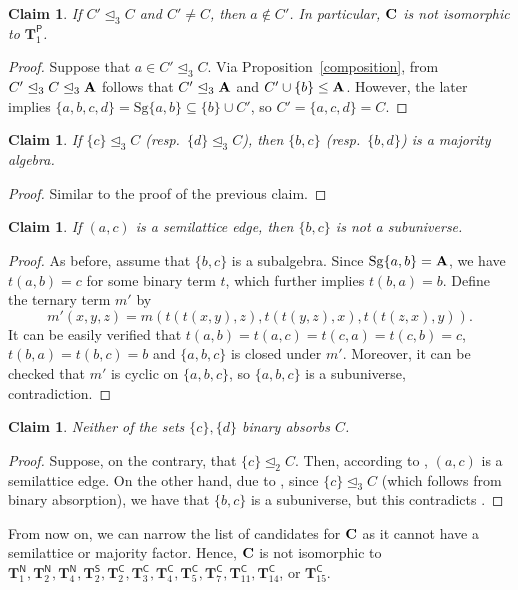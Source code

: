 \documentclass[11pt]{amsart}
\newcommand{\m}[1]{\mathbf{\uppercase{#1}}}
\newcommand{\n}{\scriptscriptstyle{\mathsf{N}}}
\newcommand{\co}{\scriptscriptstyle{\mathsf{C}}}
\theoremstyle{definition}
\theoremstyle{remark}
\theoremstyle{plain}
\newtheorem{claim}[thm]{Claim}
\def\T{\mathbf{T}}
\begin{document}
\begin{claim}\label{claimanijeu3aps}
  If $ C'\trianglelefteq_3 C$ and $C'\neq C$, then $a\notin C'$. In particular, $\m c$ is not isomorphic to $\T^{\scriptscriptstyle{\mathsf{P}}}_1$.
\end{claim}
\begin{proof}
Suppose that $a\in C'\trianglelefteq_3 C$. Via Proposition~\ref{composition}, from $C'\trianglelefteq_3C\trianglelefteq_3\m a$ follows that $C'\trianglelefteq_3\m a$ and $C'\cup\{b\}\leq \m a$. However, the later implies $\{a,b,c,d\}=\mathrm{Sg}\{a,b\}\subseteq \{b\}\cup C'$, so $C'=\{a,c,d\}=C$.   
\end{proof}
\begin{claim}\label{claimde3apbs}
If $\{c\}\trianglelefteq_3C$ (resp.~$\{d\}\trianglelefteq_3C$), then $\{b,c\}$ (resp.~$\{b,d\}$) is a majority algebra.
\end{claim}
\begin{proof}
    Similar to the proof of the previous claim.
\end{proof}
\begin{claim}\label{claimnijepodalg}
If $(a,c)$ is a semilattice edge, then $\{b,c\}$ is not a subuniverse. 
\end{claim}
\begin{proof}
As before, assume that $\{b,c\}$ is a subalgebra. Since $\mathrm{Sg}\{a,b\}=\m a$, we have $t(a,b)=c$ for some binary term $t$, which further implies $t(b,a)=b$. Define the ternary term $m'$ by $$m'(x,y,z)=m(t(t(x,y),z),t(t(y,z),x),t(t(z,x),y)).$$
It can be easily verified that $t(a,b)=t(a,c)=t(c,a)=t(c,b)=c$, $t(b,a)=t(b,c)=b$ and $\{a,b,c\}$ is closed under $m'$. Moreover, it can be checked that $m'$ is cyclic on $\{a,b,c\}$, so $\{a,b,c\}$ is a subuniverse, contradiction.
\end{proof}

\begin{claim}
Neither of the sets $\{c\},\{d\}$ binary absorbs $C$.
\end{claim}
\begin{proof}
Suppose, on the contrary, that $\{c\}\trianglelefteq_2C$. Then, according to , $(a,c)$ is a semilattice edge. On the other hand, due to , since $\{c\}\trianglelefteq_3C$ (which follows from binary absorption), we have that $\{b,c\}$ is a subuniverse, but this contradicts .
\end{proof}
From now on, we can narrow the list of candidates for $\m c$ as it cannot have a semilattice or majority factor. Hence, $\m c$ is not isomorphic to $\T_1^{\n}, \T_2^{\n},\T_4^{\n},\T^{\scriptscriptstyle{\mathsf{S}}}_2,\T^{\co}_2,\T^{\co}_3,\T^{\co}_4,\T^{\co}_5,\T^{\co}_7,\T^{\co}_{11},\T^{\co}_{14}$, or $\T^{\co}_{15}$.
\end{document}
